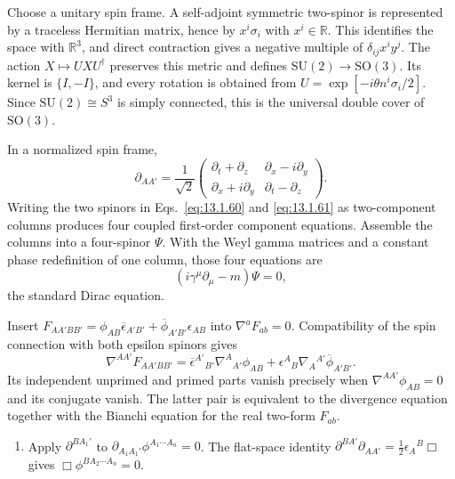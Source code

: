\ExerciseEditorialNote

\begin{enumerate}[leftmargin=2.8em,itemsep=1.2em]
Choose a unitary spin frame.  A self-adjoint symmetric two-spinor is represented
by a traceless Hermitian matrix, hence by
\(x^i\sigma_i\) with \(x^i\in\mathbb R\).  This identifies the space with
\(\mathbb R^3\), and direct contraction gives a negative multiple of
\(\delta_{ij}x^iy^j\).  The action
\(X\mapsto UXU^\dagger\) preserves this metric and defines
\(\mathrm{SU}(2)\to\mathrm{SO}(3)\).  Its kernel is \(\{I,-I\}\), and every
rotation is obtained from
\(U=\exp[-i\theta n^i\sigma_i/2]\).  Since \(\mathrm{SU}(2)\cong S^3\) is
simply connected, this is the universal double cover of \(\mathrm{SO}(3)\).

In a normalized spin frame,
\[
 \partial_{AA'}=\frac1{\sqrt2}
 \begin{pmatrix}
 \partial_t+\partial_z&\partial_x-i\partial_y\\
 \partial_x+i\partial_y&\partial_t-\partial_z
 \end{pmatrix}.
\]
Writing the two spinors in Eqs.~\eqref{eq:13.1.60} and
\eqref{eq:13.1.61} as two-component columns produces four coupled first-order
component equations.  Assemble the columns into a four-spinor \(\Psi\).  With
the Weyl gamma matrices and a constant phase redefinition of one column, those
four equations are
\[
 (i\gamma^\mu\partial_\mu-m)\Psi=0,
\]
the standard Dirac equation.

Insert
\(F_{AA'BB'}=\phi_{AB}\overline\epsilon_{A'B'}+
\overline\phi_{A'B'}\epsilon_{AB}\) into
\(\nabla^aF_{ab}=0\).  Compatibility of the spin connection with both
epsilon spinors gives
\[
 \nabla^{AA'}F_{AA'BB'}=
 \overline\epsilon^{A'}{}_{B'}\nabla^A{}_{A'}\phi_{AB}
 +\epsilon^A{}_B\nabla_A{}^{A'}\overline\phi_{A'B'}.
\]
Its independent unprimed and primed parts vanish precisely when
\(\nabla^{AA'}\phi_{AB}=0\) and its conjugate vanish.  The latter pair is
equivalent to the divergence equation together with the Bianchi equation for the
real two-form \(F_{ab}\).

\begin{enumerate}[label=\alph*),leftmargin=2em]
\item Apply \(\partial^{BA_1'}\) to
\(\partial_{A_1A_1'}\phi^{A_1\cdots A_n}=0\).  The flat-space identity
\(\partial^{BA'}\partial_{AA'}=\tfrac12\epsilon_A{}^B\Box\) gives
\(\Box\phi^{B A_2\cdots A_n}=0\).


\end{enumerate}
\end{enumerate}
